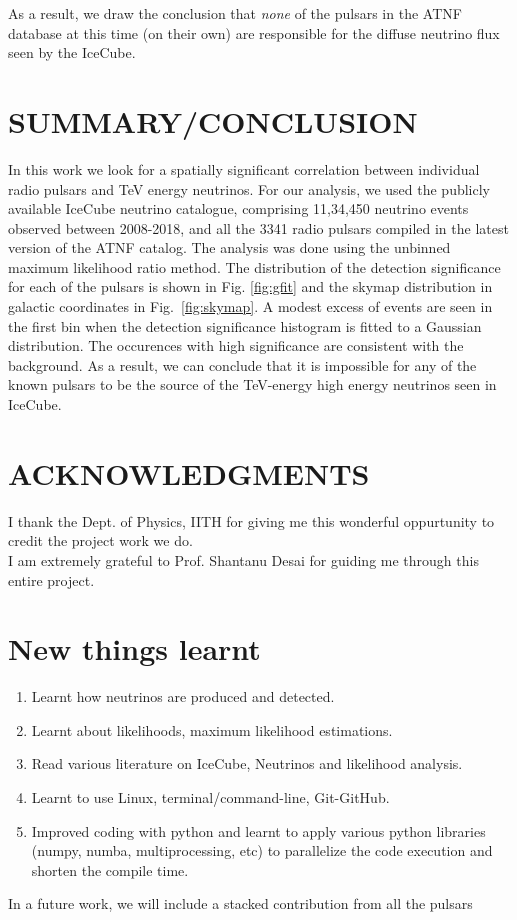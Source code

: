 \documentclass{article}
\begin{document}
 As a result, we draw the conclusion that \emph{none} of the pulsars in the ATNF database at this time (on their own) are responsible for the diffuse neutrino flux seen by the IceCube.


\section{\Large SUMMARY/CONCLUSION}
In this work we look for a spatially significant correlation between individual radio pulsars and TeV energy neutrinos. For our analysis, we used the publicly available IceCube neutrino catalogue, comprising 11,34,450 neutrino events observed
between 2008-2018, and all the 3341 radio pulsars compiled in the latest version of the ATNF catalog. The analysis was done using the unbinned maximum likelihood ratio method.
The distribution of the detection significance for each of the pulsars is shown in Fig. \ref{fig:gfit} and the skymap distribution in galactic coordinates in Fig.~\ref{fig:skymap}. A modest excess of events are seen in the first bin when the detection significance histogram is fitted to a Gaussian distribution. The occurences with high significance are consistent with the background. As a result, we can conclude that it is impossible for any of the known pulsars to be the source of the TeV-energy high energy neutrinos seen in IceCube.
\newpage
\section*{\Large ACKNOWLEDGMENTS}
I thank the Dept. of Physics, IITH for giving me this wonderful oppurtunity to credit the project work we do.\\
I am extremely grateful to Prof. Shantanu Desai for guiding me through this entire project. %
\section*{New things learnt}
\begin{enumerate}
	\item Learnt how neutrinos are produced and detected.
	\item Learnt about likelihoods, maximum likelihood estimations.
	\item Read various literature on IceCube, Neutrinos and likelihood analysis.
	\item Learnt to use Linux, terminal/command-line, Git-GitHub.
	\item Improved coding with python and learnt to apply various python libraries (numpy, numba, multiprocessing, etc) to parallelize the code execution and shorten the compile time.
\end{enumerate}
In a future work, we will include a stacked contribution from all the pulsars
\newpage


\end{document}
